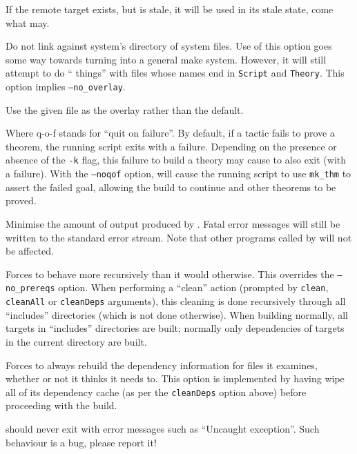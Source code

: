 \begin{description}
If the remote target exists, but is stale, it will be used in its stale state, come what may.
\item[\texttt{--no\_sigobj}]
  Do not link against \HOL{} system's directory of \HOL{} system files.
  Use of this option goes some way towards turning \holmake{} into a general \ML{} \textsf{make} system.
  However, it will still attempt to do ``\HOL{} things'' with files whose names end in \texttt{Script} and \texttt{Theory}.
  This option implies \texttt{--no\_overlay}.
\item[\texttt{--overlay <file>}] Use the given file as the overlay
  rather than the default.
\item[\texttt{--qof},\texttt{--noqof}]
  Where q-o-f stands for ``quit on failure''.
  By default, if a tactic fails to prove a theorem, the running script exits with a failure.
  Depending on the presence or absence of the \texttt{-k} flag, this failure to build a theory may cause \holmake{} to also exit (with a failure).
  With the \texttt{--noqof} option, \holmake{} will cause the running script to use \texttt{mk\_thm} to assert the failed goal, allowing the build to continue and other theorems to be proved.
\item[\texttt{--quiet}] Minimise the amount of output produced by
  \holmake{}.  Fatal error messages will still be written to the
  standard error stream.  Note that other programs called by \holmake{} will not
  be affected.
\item[\texttt{-r}]%
%
Forces \holmake{} to behave more recursively than it would otherwise.
This overrides the \texttt{--no\_prereqs} option.
When performing a ``clean'' action (prompted by \texttt{clean}, \texttt{cleanAll} or \texttt{cleanDeps} arguments), this cleaning is done recursively through all ``includes'' directories (which is not done otherwise).
When building normally, all targets in ``includes'' directories are built; normally only dependencies of targets in the current directory are built.
\item[{\tt --rebuild\_deps}] Forces \holmake{} to always
  rebuild the dependency information for files it examines, whether or
  not it thinks it needs to.  This option is implemented by having
  \holmake{} wipe all of its dependency cache (as per the
  \texttt{cleanDeps} option above) before proceeding with the build.
\end{description}

\noindent \holmake{} should never exit with error messages such as ``Uncaught
exception''.  Such behaviour is a bug, please report it!


